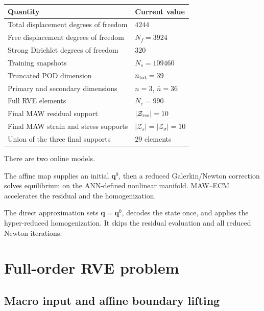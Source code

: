 \documentclass[11pt,a4paper]{article}
\newcommand{\vect}[1]{\mathbf{#1}}
\newcommand{\set}[1]{\mathcal{#1}}
\begin{document}
\begin{center}
\begin{tabular}{@{}ll@{}}
\toprule
Quantity & Current value \\
\midrule
Total displacement degrees of freedom & \(4244\) \\
Free displacement degrees of freedom & \(N_f=3924\) \\
Strong Dirichlet degrees of freedom & \(320\) \\
Training snapshots & \(N_s=109460\) \\
Truncated POD dimension & \(n_{\rm tot}=39\) \\
Primary and secondary dimensions & \(n=3\), \(\bar n=36\) \\
Full RVE elements & \(N_e=990\) \\
Final MAW residual support & \(|\set Z_{\rm res}|=10\) \\
Final MAW strain and stress supports & \(|\set Z_{\varepsilon}|=|\set Z_{\sigma}|=10\) \\
Union of the three final supports & \(29\) elements \\
\bottomrule
\end{tabular}
\end{center}

There are two online models.
\begin{description}[leftmargin=33mm,style=nextline]
  \item[HPROM--ANN] The affine map supplies an initial \(\vect q^0\), then
  a reduced Galerkin/Newton correction solves equilibrium on the
  ANN-defined nonlinear manifold.  MAW--ECM accelerates the residual and the
  homogenization.
  \item[D-HPROM--ANN] The direct approximation sets \(\vect q=\vect q^0\),
  decodes the state once, and applies the hyper-reduced homogenization.  It
  skips the residual evaluation and all reduced Newton iterations.
\end{description}

\section{Full-order RVE problem}
\label{sec:fom}

\subsection{Macro input and affine boundary lifting}
\end{document}
